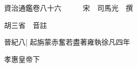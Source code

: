 






























































資治通鑑卷八十六　　　宋　司馬光　撰

胡三省　音註

晉紀八|{
	起旃蒙赤奮若盡著雍執徐凡四年}


孝惠皇帝下

